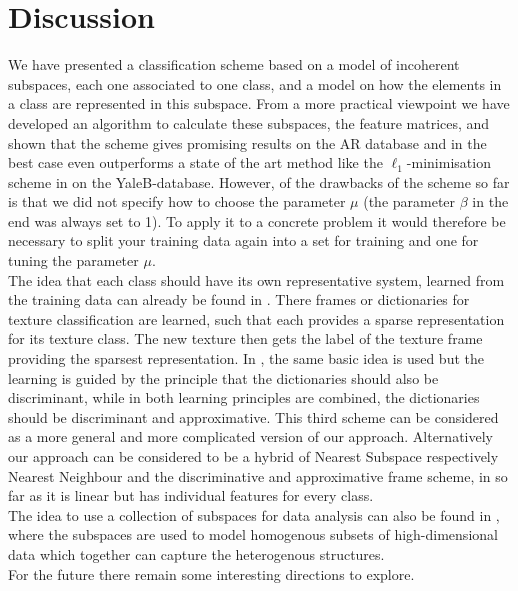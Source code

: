 \documentclass[11pt]{article}
\begin{document}
\section{Discussion}
We have presented a classification scheme based on a model of incoherent subspaces, each one associated to one class, and a model on how the elements in a class are represented in this subspace.  From a more practical viewpoint we have developed an algorithm to calculate these subspaces, \ie the feature matrices, and shown that the scheme gives promising results on the AR database and in the best case even outperforms a state of the art method like the $\ell_1$-minimisation scheme in \cite{wrma09} on the YaleB-database. However, of the drawbacks of the scheme so far is that we did not specify how to choose the parameter $\mu$ (the parameter $\beta$ in the end was always set to 1). To apply it to a concrete problem it would therefore be necessary to split your training data again into a set for training and one for tuning the parameter $\mu$.\\
The idea that each class should have its own representative system, learned from the training data can already be found in \cite{skhu06}. There frames or dictionaries for texture classification are learned, such that each provides a sparse representation for its texture class. The new texture then gets the label of the texture frame providing the sparsest representation. In \cite{masazi08}, the same basic idea is used but the learning is guided by the principle that the dictionaries should also be discriminant, while in \cite{rosa08} both learning principles are combined, \ie the dictionaries should be discriminant and approximative. This third scheme can be considered as a more general and more complicated version of our approach. Alternatively our approach can be considered to be a hybrid of Nearest Subspace respectively Nearest Neighbour and the discriminative and approximative frame scheme, in so far as it is linear but has individual features for every class. \\
The idea to use a collection of subspaces for data analysis can also be found in \cite{Mayadefo08}, where the subspaces are used to model homogenous subsets of high-dimensional data which together can capture the heterogenous structures.\\
For the future there remain some interesting directions to explore.
\end{document}
